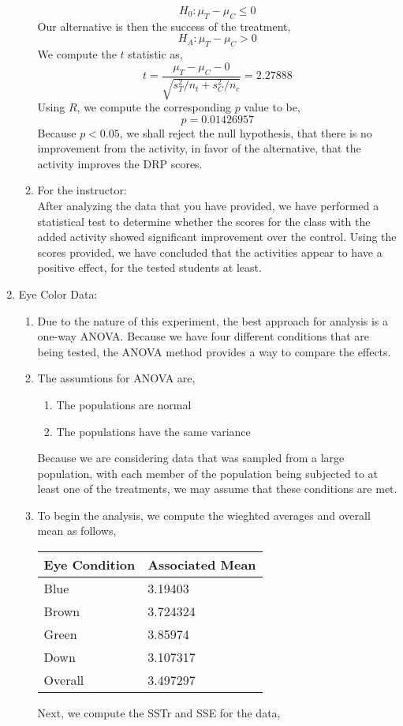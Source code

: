 \documentclass[letterpaper,10pt]{article}
\begin{document}
\begin{enumerate}
\begin{enumerate}
\[H_0: \mu_T-\mu_C\leq 0\]
Our alternative is then the success of the treatment,
\[H_A: \mu_T-\mu_C > 0\]
We compute the $t$ statistic as,
\[t=\frac{\mu_T-\mu_C-0}{\sqrt{s_T^2/n_t+s_C^2/n_c}}=2.27888\]
Using $R$, we compute the corresponding $p$ value to be,
\[p=0.01426957\]
Because $p<0.05$, we shall reject the null hypothesis, that there is no improvement from the activity, in favor of the alternative, that the activity improves the DRP scores. 
\item For the instructor:\\
After analyzing the data that you have provided, we have performed a statistical test to determine whether the scores for the class with the added activity showed significant improvement over the control. Using the scores provided, we have concluded that the activities appear to have a positive effect, for the tested students at least.
\end{enumerate}
\item Eye Color Data:
\begin{enumerate}
\item Due to the nature of this experiment, the best approach for analysis is a one-way ANOVA. Because we have four different conditions that are being tested, the ANOVA method provides a way to compare the effects.
\item The assumtions for ANOVA are,
\begin{enumerate}
\item The populations are normal
\item The populations have the same variance
\end{enumerate}
Because we are considering data that was sampled from a large population, with each member of the population being subjected to at least one of the treatments, we may assume that these conditions are met.
\item To begin the analysis, we compute the wieghted averages and overall mean as follows,
\begin{center}
\begin{tabular}{l|l}
Eye Condition & Associated Mean \\\hline
Blue & 3.19403 \\
Brown & 3.724324 \\
Green & 3.85974\\
Down & 3.107317\\
Overall & 3.497297
\end{tabular}
\end{center}
Next, we compute the SSTr and SSE for the data,

\end{enumerate}
\end{enumerate}
\end{document}
